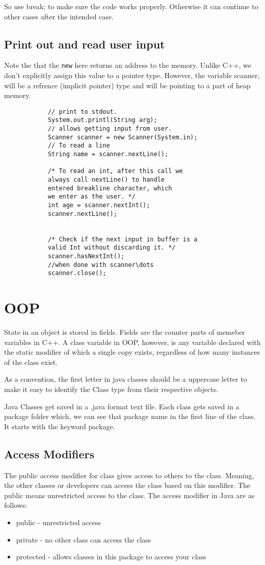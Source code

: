 \documentclass[11pt,twoside,a4paper]{report}
\begin{document}
So use break; to make sure the code works properly. Otherwise it can continue to other cases after the intended case.

\section{Print out and read user input}
Note the that the \verb|new| here returns an address to the memory. Unlike C++, we don't explicitly assign this value to a pointer type.
However, the variable scanner, will be a refrence (implicit pointer) type and will be pointing to a part of heap memory.
\begin{lstlisting}
            // print to stdout.
            System.out.printl(String arg);
            // allows getting input from user.
            Scanner scanner = new Scanner(System.in);
            // To read a line
            String name = scanner.nextLine();

            /* To read an int, after this call we 
            always call nextLine() to handle 
            entered breakline character, which 
            we enter as the user. */
            int age = scanner.nextInt();
            scanner.nextLine();
            

            /* Check if the next input in buffer is a 
            valid Int without discarding it. */
            scanner.hasNextInt();
            //when done with scanner\dots
            scanner.close();
            \end{lstlisting}

\chapter{OOP}
State in an object is stored in fields. Fields are the counter parts of memeber variables in C++.
A class variable in OOP, however, is any variable declared with the static modifier of which a single copy exists, regardless of how many instances of the class exist.

As a convention, the first letter in java classes should be a uppercase letter to make it easy to identify the Class type from their respective objects.

Java Classes get saved in a .java format text file. Each class gets saved in a package folder which, we can see that package name in the first line of the class. It starts with the keyword package.

\section{Access Modifiers}
The public access modifier for class gives access to others to the class. Meaning, the other classes or developers can access the class based on this modifier. 
The public means unrestricted access to the class.
The access modifier in Java are as follows:
\begin{itemize}
    \item public - unrestricted access
    \item private - no other class can access the class
    \item protected - allows classes in this package to access your class
\end{itemize}
\end{document}
